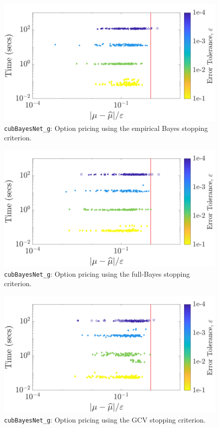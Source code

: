\documentclass{iitthesis}          %
\newcommand{\code}[1]{\texttt{#1}}
\begin{document}
{{{{{{\begin{figure}
	\centering
	\includegraphics[width=0.95\linewidth]{"Sobol/Sobol_optPrice_guaranteed_time_MLE__d12_r1_2019-Jun-13"}
	\caption[Sobol: Option pricing Guaranteed: MLE]{\code{cubBayesNet\_g}: Option pricing using the empirical Bayes stopping criterion.}
	\label{fig:Sobol-optprice-guaranteed-MLE}
\end{figure}
\begin{figure}
	\centering
	\includegraphics[width=0.95\linewidth]{"Sobol/Sobol_optPrice_guaranteed_time_full__d12_r1_2019-Jun-13"}
	\caption[Sobol: Option pricing Guaranteed: Full Bayes]{\code{cubBayesNet\_g}: Option pricing using the full-Bayes stopping criterion.}
	\label{fig:Sobol-optprice-guaranteed-FB}
\end{figure}
\begin{figure}
	\centering
	\includegraphics[width=0.95\linewidth]{"Sobol/Sobol_optPrice_guaranteed_time_GCV__d12_r1_2019-Jun-13"}
	\caption[Sobol: Option pricing Guaranteed: GCV]{\code{cubBayesNet\_g}: Option pricing using the GCV stopping criterion.}
	\label{fig:Sobol-optprice-guaranteed-GCV}
\end{figure}




}}}}}}
\end{document}
